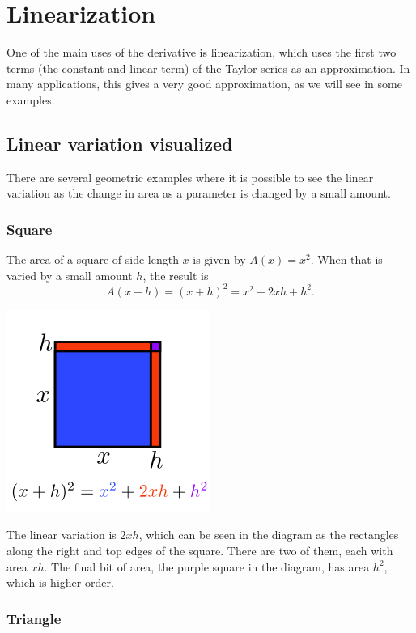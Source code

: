 \documentclass[twoside,openright,titlepage,a4paper]{book}
\begin{document}
\begin{sloppypar}
\section{Linearization} \label{ChDifferentiationSecLinearization}

One of the main uses of the derivative is linearization, which uses the first two terms (the constant and linear term) of the Taylor series as an approximation. In many applications, this gives a very good approximation, as we will see in some examples.

\subsection{Linear variation visualized}

There are several geometric examples where it is possible to see the linear variation as the change in area as a parameter is changed by a small amount.

\subsubsection{Square}

The area of a square of side length $x$ is given by $A(x) = x^2$. When that is varied by a small amount $h$, the result is \[ A(x+h) = (x+h)^2 = x^2+2xh+h^2. \]
\begin{center}\includegraphics[scale=0.6]{SquareVariation}\end{center}

The linear variation is $2xh$, which can be seen in the diagram as the rectangles along the right and top edges of the square. There are two of them, each with area $xh$. The final bit of area, the purple square in the diagram, has area $h^2$, which is higher order.

\subsubsection{Triangle}


\end{sloppypar}
\end{document}
